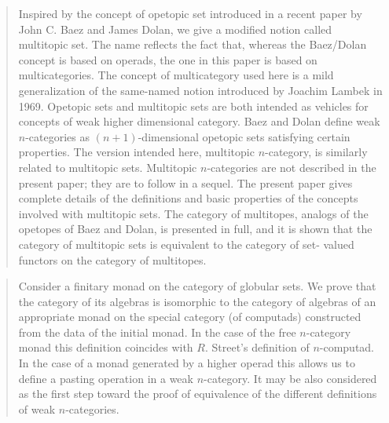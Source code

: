 \documentclass{article}
\def\tightlist{}
\renewcommand{\texttt}[1]{%
  \begingroup
  \ttfamily
  \begingroup\lccode`~=`/\lowercase{\endgroup\def~}{/\discretionary{}{}{}}%
  \begingroup\lccode`~=`[\lowercase{\endgroup\def~}{[\discretionary{}{}{}}%
  \begingroup\lccode`~=`.\lowercase{\endgroup\def~}{.\discretionary{}{}{}}%
  \catcode`/=\active\catcode`[=\active\catcode`.=\active
  \scantokens{#1\noexpand}%
  \endgroup
}
\begin{document}

\begin{quote}
Inspired by the concept of opetopic set introduced in a recent paper by
John C. Baez and James Dolan, we give a modified notion called
multitopic set. The name reflects the fact that, whereas the Baez/Dolan
concept is based on operads, the one in this paper is based on
multicategories. The concept of multicategory used here is a mild
generalization of the same-named notion introduced by Joachim Lambek in
1969. Opetopic sets and multitopic sets are both intended as vehicles
for concepts of weak higher dimensional category. Baez and Dolan define
weak \(n\)-categories as \((n+1)\)-dimensional opetopic sets satisfying
certain properties. The version intended here, multitopic
\(n\)-category, is similarly related to multitopic sets. Multitopic
\(n\)-categories are not described in the present paper; they are to
follow in a sequel. The present paper gives complete details of the
definitions and basic properties of the concepts involved with
multitopic sets. The category of multitopes, analogs of the opetopes of
Baez and Dolan, is presented in full, and it is shown that the category
of multitopic sets is equivalent to the category of set- valued functors
on the category of multitopes.
\end{quote}


\begin{quote}
Consider a finitary monad on the category of globular sets. We prove
that the category of its algebras is isomorphic to the category of
algebras of an appropriate monad on the special category (of computads)
constructed from the data of the initial monad. In the case of the free
\(n\)-category monad this definition coincides with \({R}\). Street's
definition of \(n\)-computad. In the case of a monad generated by a
higher operad this allows us to define a pasting operation in a weak
\(n\)-category. It may be also considered as the first step toward the
proof of equivalence of the different definitions of weak
\(n\)-categories.
\end{quote}
\end{document}
